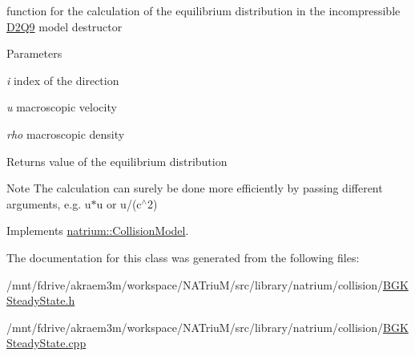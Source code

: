 function for the calculation of the equilibrium distribution in the incompressible \hyperlink{classnatrium_1_1D2Q9}{D2Q9} model destructor


\begin{DoxyParams}{Parameters}
\item[{\em i}]index of the direction \item[{\em u}]macroscopic velocity \item[{\em rho}]macroscopic density \end{DoxyParams}
\begin{DoxyReturn}{Returns}
value of the equilibrium distribution 
\end{DoxyReturn}
\begin{DoxyNote}{Note}
The calculation can surely be done more efficiently by passing different arguments, e.g. u$\ast$u or u/(c$^\wedge$2) 
\end{DoxyNote}


Implements \hyperlink{classnatrium_1_1CollisionModel_a88b382d63da80e950bc58e8afad769a6}{natrium::CollisionModel}.

The documentation for this class was generated from the following files:\begin{DoxyCompactItemize}
\item 
/mnt/fdrive/akraem3m/workspace/NATriuM/src/library/natrium/collision/\hyperlink{BGKSteadyState_8h}{BGKSteadyState.h}\item 
/mnt/fdrive/akraem3m/workspace/NATriuM/src/library/natrium/collision/\hyperlink{BGKSteadyState_8cpp}{BGKSteadyState.cpp}\end{DoxyCompactItemize}
